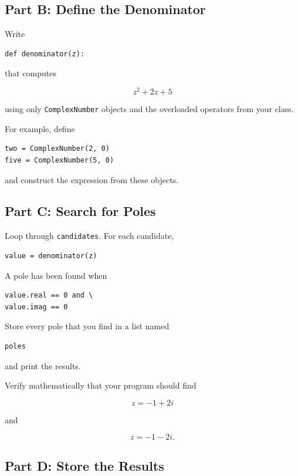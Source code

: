 \documentclass{article}
\begin{document}
\subsection*{Part B: Define the Denominator}

Write

\begin{verbatim}
def denominator(z):
\end{verbatim}

that computes

\[
z^2+2z+5
\]

using only \texttt{ComplexNumber} objects and the overloaded
operators from your class.

For example, define

\begin{verbatim}
two = ComplexNumber(2, 0)
five = ComplexNumber(5, 0)
\end{verbatim}

and construct the expression from these objects.

\subsection*{Part C: Search for Poles}

Loop through \texttt{candidates}. For each candidate,

\begin{verbatim}
value = denominator(z)
\end{verbatim}

A pole has been found when

\begin{verbatim}
value.real == 0 and \
value.imag == 0
\end{verbatim}

Store every pole that you find in a list named

\begin{verbatim}
poles
\end{verbatim}

and print the results.

Verify mathematically that your program should find

\[
\boxed{z=-1+2i}
\]

and

\[
\boxed{z=-1-2i}.
\]

\subsection*{Part D: Store the Results}
\end{document}

